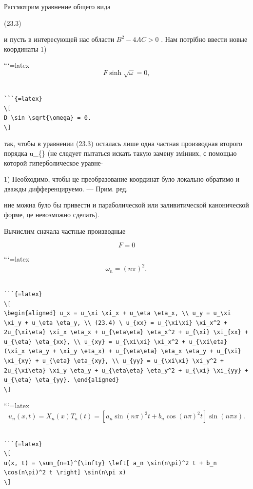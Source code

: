 \documentclass[
  ukrainian,
]{article}
\begin{document}
Рассмотрим уравнение общего вида

(23.3)

и пусть в интересующей нас области \(B^2 - 4AC > 0\) . Нам потрібно
ввести новые координаты 1)

```{=latex}
\[
F \sinh \sqrt{\omega} = 0,
\]

\begin{verbatim}

```{=latex}
\[
D \sin \sqrt{\omega} = 0.
\]
\end{verbatim}

так, чтобы в уравнении (23.3) осталась лише одна частная производная
второго порядка u\_\{\xi\eta\} (не следует пытаться искать такую замену
змінних, с помощью которой гиперболическое уравне-

1) Необходимо, чтобы це преобразование координат було локально обратимо
и дважды дифференцируемо. --- Прим. ред.

ние можна було бы привести и параболической или заливитической
канонической форме, це невозможно сделать).

Вычислим сначала частные производные

\[
F = 0
\]

```{=latex}
\[
\omega_n = (n\pi)^2,
\]

\begin{verbatim}

```{=latex}
\[
\begin{aligned} u_x = u_\xi \xi_x + u_\eta \eta_x, \\ u_y = u_\xi \xi_y + u_\eta \eta_y, \\ (23.4) \ u_{xx} = u_{\xi\xi} \xi_x^2 + 2u_{\xi\eta} \xi_x \eta_x + u_{\eta\eta} \eta_x^2 + u_{\xi} \xi_{xx} + u_{\eta} \eta_{xx}, \\ u_{xy} = u_{\xi\xi} \xi_x^2 + u_{\xi\eta} (\xi_x \eta_y + \xi_y \eta_x) + u_{\eta\eta} \eta_x \eta_y + u_{\xi} \xi_{xy} + u_{\eta} \eta_{xy}, \\ u_{yy} = u_{\xi\xi} \xi_y^2 + 2u_{\xi\eta} \xi_y \eta_y + u_{\eta\eta} \eta_y^2 + u_{\xi} \xi_{yy} + u_{\eta} \eta_{yy}. \end{aligned}
\]
\end{verbatim}

```{=latex}
\[
u_n(x, t) = X_n(x) T_n(t) = [a_n \sin(n\pi)^2 t + b_n \cos(n\pi)^2 t] \sin(n\pi x).
\]

\begin{verbatim}

```{=latex}
\[
u(x, t) = \sum_{n=1}^{\infty} \left[ a_n \sin(n\pi)^2 t + b_n \cos(n\pi)^2 t \right] \sin(n\pi x)
\]
\end{verbatim}
\end{document}
